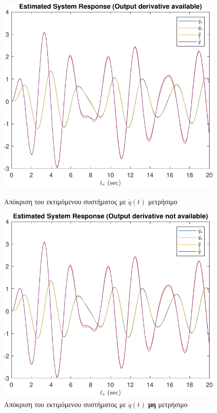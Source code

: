 \documentclass[a4paper,12pt]{article}
\begin{document}
\begin{figure}[!h]
    \centering
    \begin{minipage}{0.45\textwidth}
        \centering
        \includegraphics[width=\linewidth]{plot/task2_response_with_derivative.pdf}
        \caption{Απόκριση του εκτιμόμενου συστήματος με $\dot{q}(t)$ μετρήσιμο}
        \label{fig:task2_response_with_derivative}
    \end{minipage}
    \hfill
    \begin{minipage}{0.45\textwidth}
        \centering
        \includegraphics[width=\linewidth]{plot/task2_response_without_derivative.pdf}
        \caption{Απόκριση του εκτιμόμενου συστήματος με $\dot{q}(t)$ \textbf{μη} μετρήσιμο}
        \label{fig:task2_response_without_derivative}
    \end{minipage}
\end{figure}
\end{document}
